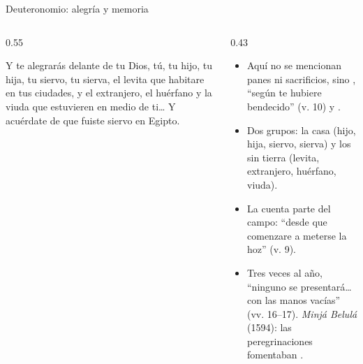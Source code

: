 \begin{frame}{Deuteronomio: alegría y memoria}
\begin{columns}[c,onlytextwidth]
\begin{column}{0.55\textwidth}
\begin{cita}Y te alegrarás delante de \SENOR{} tu Dios, tú, tu hijo, tu hija, tu siervo, tu sierva, el levita que habitare en tus ciudades, y el extranjero, el huérfano y la viuda que estuvieren en medio de ti\ldots{} Y acuérdate de que fuiste siervo en Egipto.\end{cita}
\end{column}
\begin{column}{0.43\textwidth}\small
\begin{itemize}
\item Aquí no se mencionan panes ni sacrificios, sino ,  ``según te hubiere bendecido'' (v. 10) y .
\item Dos grupos: la casa (hijo, hija, siervo, sierva) y los sin tierra (levita, extranjero, huérfano, viuda).
\item La cuenta parte del campo: ``desde que comenzare a meterse la hoz'' (v. 9).\item Tres veces al año, ``ninguno se presentará\ldots{} con las manos vacías'' (vv. 16--17). \emph{Minjá Belulá} (1594): las peregrinaciones fomentaban .
\end{itemize}
\end{column}
\end{columns}
\end{frame}

